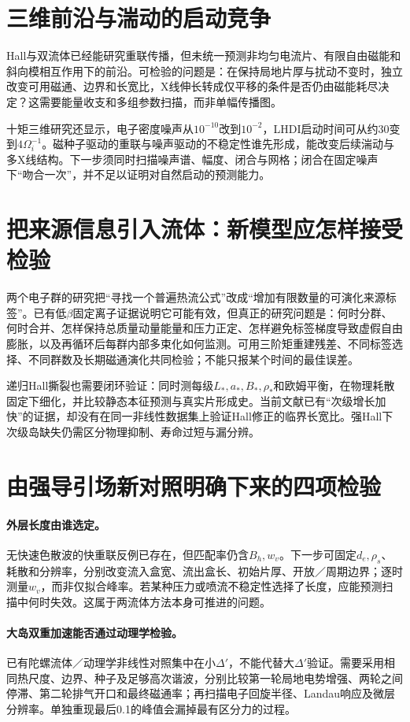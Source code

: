 \documentclass[UTF8,a4paper,11pt,openany,fontset=fandol]{ctexbook}
\begin{document}
\section{三维前沿与湍动的启动竞争}
Hall与双流体已经能研究重联传播，但未统一预测非均匀电流片、有限自由磁能和斜向模相互作用下的前沿。可检验的问题是：在保持局地片厚与扰动不变时，独立改变可用磁通、边界和长宽比，X线伸长转成仅平移的条件是否仍由磁能耗尽决定？这需要能量收支和多组参数扫描，而非单幅传播图。\citep{L275}

十矩三维研究还显示，电子密度噪声从$10^{-10}$改到$10^{-2}$，LHDI启动时间可从约$30$变到$4\Omega_i^{-1}$。磁种子驱动的重联与噪声驱动的不稳定性谁先形成，能改变后续湍动与多X线结构。下一步须同时扫描噪声谱、幅度、闭合与网格；闭合在固定噪声下“吻合一次”，并不足以证明对自然启动的预测能力。\citep{E552}

\section{把来源信息引入流体：新模型应怎样接受检验}
两个电子群的研究把“寻找一个普遍热流公式”改成“增加有限数量的可演化来源标签”。已有低$\beta$固定离子证据说明它可能有效，但真正的研究问题是：何时分群、何时合并、怎样保持总质量动量能量和压力正定、怎样避免标签梯度导致虚假自由膨胀，以及再循环后每群内部多束化如何监测。可用三阶矩重建残差、不同标签选择、不同群数及长期磁通演化共同检验；不能只报某个时间的最佳误差。\citep{F635}

递归Hall撕裂也需要闭环验证：同时测每级$L_*,a_*,B_*,\rho_*$和欧姆平衡，在物理耗散固定下细化，并比较静态本征预测与真实片形成史。当前文献已有“次级增长加快”的证据，却没有在同一非线性数据集上验证Hall修正的临界长宽比。强Hall下次级岛缺失仍需区分物理抑制、寿命过短与漏分辨。\citep{L236,L262}

\section{由强导引场新对照明确下来的四项检验}
\paragraph{外层长度由谁选定。}无快速色散波的快重联反例已存在，但匹配率仍含$B_h,w_v$。下一步可固定$d_e,\rho_s$、耗散和分辨率，分别改变流入盒宽、流出盒长、初始片厚、开放／周期边界；逐时测量$w_v$，而非仅拟合峰率。若某种压力或喷流不稳定性选择了长度，应能预测扫描中何时失效。这属于两流体方法本身可推进的问题。\citep{L216,L217}

\paragraph{大岛双重加速能否通过动理学检验。}已有陀螺流体／动理学非线性对照集中在小$\Delta'$，不能代替大$\Delta'$验证。需要采用相同热尺度、边界、种子及足够高次谐波，分别比较第一轮局地电势增强、两轮之间停滞、第二轮排气开口和最终磁通率；再扫描电子回旋半径、Landau响应及微层分辨率。单独重现最后0.1的峰值会漏掉最有区分力的过程。\citep{F672,E475}
\end{document}
